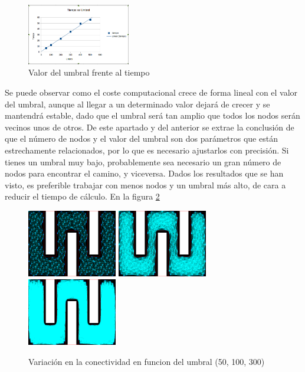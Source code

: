 \begin{figure}[H]
		\centering
        \includegraphics[width=0.4\textwidth]{images/t_vs_umbral.png}
        \caption{Valor del umbral frente al tiempo}
        \label{fig:umbral_vs_t}
\end{figure}

Se puede observar como el coste computacional crece de forma lineal con el valor del umbral, aunque al llegar a un determinado valor dejará de crecer y se mantendrá estable, dado que el umbral será tan amplio que todos los nodos serán vecinos unos de otros. De este apartado y del anterior se extrae la conclusión de que el número de nodos y el valor del umbral son dos parámetros que están estrechamente relacionados, por lo que es necesario ajustarlos con precisión. Si tienes un umbral muy bajo, probablemente sea necesario un gran número de nodos para encontrar el camino, y viceversa. Dados los resultados que se han visto, es preferible trabajar con menos nodos y un umbral más alto, de cara a reducir el tiempo de cálculo. En la figura \ref{fig:50_100_300umbral}

\begin{figure}[h]
		\centering
        \includegraphics[width=0.35\textwidth]{images/50-500points.png}
        \includegraphics[width=0.35\textwidth]{images/100-500points.png}
        \includegraphics[width=0.35\textwidth]{images/300-500points.png}
        \caption{Variación en la conectividad en funcion del umbral (50, 100, 300)}
        \label{fig:50_100_300umbral}
\end{figure}

